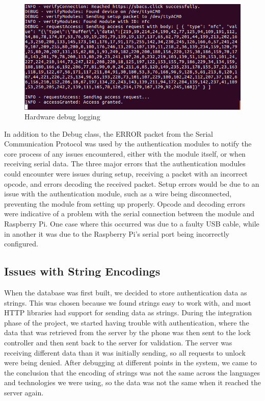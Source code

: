 \documentclass[12pt]{report}
\let\Oldsubsection\subsection
\renewcommand{\subsection}{\FloatBarrier\Oldsubsection}
\begin{document}
\begin{figure}
    \includegraphics[width=\textwidth]{Diagrams/Hardware-Diagrams/access_granted}
    \caption{Hardware debug logging}
    \label{fig:hardware-debug-logging}
\end{figure}

In addition to the Debug class, the ERROR packet from the Serial Communication Protocol was used by the authentication 
modules to notify the core process of any issues encountered, either with the module itself, or when receiving serial 
data. The three major errors that the authentication modules could encounter were issues during setup, receiving a 
packet with an incorrect opcode, and errors decoding the received packet. Setup errors would be due to an issue with 
the authentication module, such as a wire being disconnected, preventing the module from setting up properly. Opcode 
and decoding errors were indicative of a problem with the serial connection between the module and Raspberry Pi. One 
case where this occurred was due to a faulty USB cable, while in another it was due to the Raspberry Pi's serial port 
being incorrectly configured.

\subsection{Issues with String Encodings} \label{issues-with-string-encodings}

When the database was first built, we decided to store authentication data as strings. This
was chosen because we found strings easy to work with, and most HTTP libraries had support
for sending data as strings. During the integration phase of the project, we started having trouble
with authentication, where the data that was retrieved from the server by the phone was then sent
to the lock controller and then sent back to the server for validation. The server was receiving
different data than it was initially sending, so all requests to unlock were being denied. After
debugging at different points in the system, we came to the conclusion that the encoding of
strings was not the same across the languages and technologies we were using, so the data was
not the same when it reached the server again.
\end{document}
